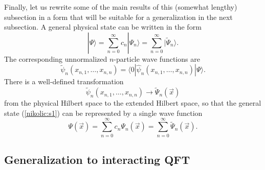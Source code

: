 \documentclass[12pt,twoside]{report} %
\begin{document}
Finally, let us rewrite some of the
main results of this (somewhat lengthy) subsection in a form
that will be suitable for a generalization in the next subsection.
A general physical state can be written in the form
\begin{equation}\label{nikolic:s1}
|\Psi\rangle = \sum_{n=0}^{\infty} c_n |\Psi_n\rangle = 
\sum_{n=0}^{\infty}  |\tilde{\Psi}_n\rangle .
\end{equation} 
The corresponding unnormalized $n$-particle wave functions are
\begin{equation}\label{nikolic:s2}
 \tilde{\psi}_n(x_{n,1},\ldots,x_{n,n}) =
\langle 0|\hat{\psi}_n(x_{n,1},\ldots,x_{n,n})|\Psi\rangle .
\end{equation}
There is a well-defined transformation 
\begin{equation}\label{nikolic:s3}
 \tilde{\psi}_n(x_{n,1},\ldots,x_{n,n}) \rightarrow \tilde{\Psi}_n(\vec{x})  
\end{equation}
from the physical Hilbert space to the extended Hilbert space, so that
the general state (\ref{nikolic:s1}) can be represented by a single wave function
\begin{equation}\label{nikolic:s4}
\Psi(\vec{x})=\sum_{n=0}^{\infty} c_n \Psi_n(\vec{x})
=\sum_{n=0}^{\infty} \tilde{\Psi}_n(\vec{x}).
\end{equation}


\subsection{Generalization to interacting QFT}
\label{nikolic:SEC3.3}
\end{document}
